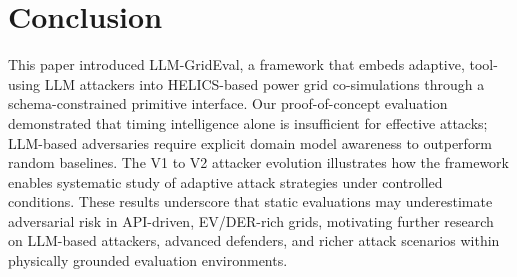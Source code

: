 \section{Conclusion}

This paper introduced LLM-GridEval, a framework that embeds adaptive, tool-using LLM attackers into HELICS-based power grid co-simulations through a schema-constrained primitive interface. Our proof-of-concept evaluation demonstrated that timing intelligence alone is insufficient for effective attacks; LLM-based adversaries require explicit domain model awareness to outperform random baselines. The V1 to V2 attacker evolution illustrates how the framework enables systematic study of adaptive attack strategies under controlled conditions. These results underscore that static evaluations may underestimate adversarial risk in API-driven, EV/DER-rich grids, motivating further research on LLM-based attackers, advanced defenders, and richer attack scenarios within physically grounded evaluation environments.
